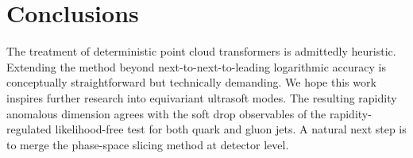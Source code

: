 \section{Conclusions}\label{sec:conclusions}

The treatment of deterministic point cloud transformers is admittedly
heuristic. Extending the method beyond next-to-next-to-leading
logarithmic accuracy is conceptually straightforward but technically
demanding. We hope this work inspires further research into equivariant
ultrasoft modes. The resulting rapidity anomalous dimension agrees with
the soft drop observables of the rapidity-regulated likelihood-free test
for both quark and gluon jets. A natural next step is to merge the
phase-space slicing method at detector level.


